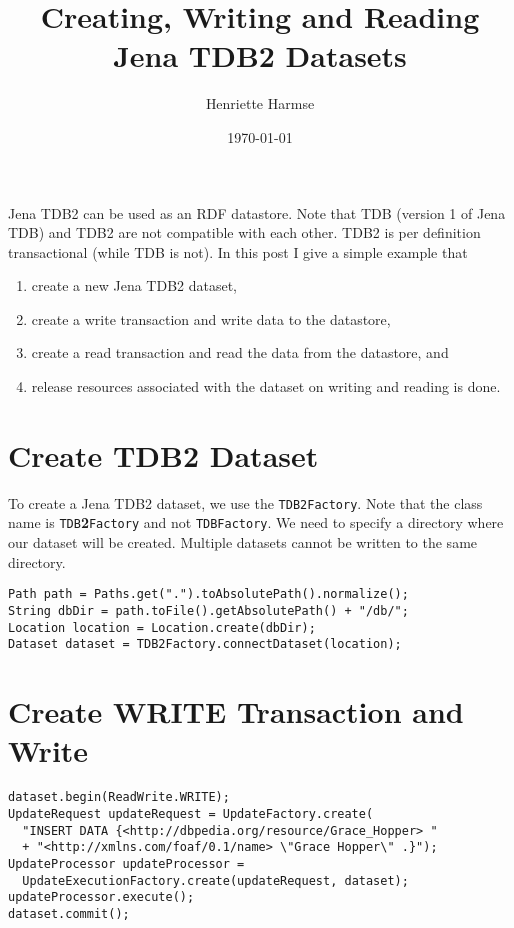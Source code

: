 \documentclass{amsart}
\title{Creating, Writing and Reading Jena TDB2 Datasets}
\author{Henriette Harmse}
\date{\today}
\begin{document}
\maketitle
  Jena TDB2 can be used as an RDF datastore. Note that TDB (version 1 of Jena TDB) and TDB2 are not compatible with each other. 
  TDB2 is per definition transactional (while TDB is not). In this post I give a simple example that
  \begin{enumerate}
   \item create a new Jena TDB2 dataset,
   \item create a write transaction and write data to the datastore, 
   \item create a read transaction and read the data from the datastore, and
   \item release resources associated with the dataset on writing and reading is done.
  \end{enumerate}


  \section{Create TDB2 Dataset}
  To create a Jena TDB2 dataset, we use the \texttt{TDB2Factory}. Note that the class name is \texttt{TDB}\textbf{2}\texttt{Factory} and not \texttt{TDBFactory}. We need to specify a directory where our dataset will be created. Multiple datasets cannot be written to the same directory.
  
  \begin{small}
   \begin{verbatim}
Path path = Paths.get(".").toAbsolutePath().normalize();      
String dbDir = path.toFile().getAbsolutePath() + "/db/"; 
Location location = Location.create(dbDir);      
Dataset dataset = TDB2Factory.connectDataset(location);    
   \end{verbatim}
  \end{small}
  
  \section{Create WRITE Transaction and Write}
  \begin{small}
   \begin{verbatim}
dataset.begin(ReadWrite.WRITE);
UpdateRequest updateRequest = UpdateFactory.create(
  "INSERT DATA {<http://dbpedia.org/resource/Grace_Hopper> " 
  + "<http://xmlns.com/foaf/0.1/name> \"Grace Hopper\" .}");
UpdateProcessor updateProcessor = 
  UpdateExecutionFactory.create(updateRequest, dataset);
updateProcessor.execute();
dataset.commit();    
   \end{verbatim}
  \end{small}
  
\end{document}
